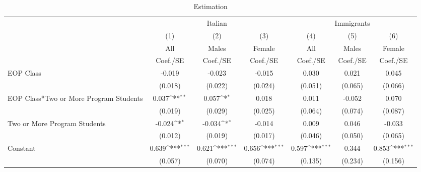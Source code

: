 \begin{table}[htbp]\centering
\def\sym#1{\ifmmode^{#1}\else\(^{#1}\)\fi}
\caption{Estimation \label{peer\_lictec2}}
\begin{tabular}{l*{6}{c}}
\toprule
                    &\multicolumn{3}{c}{Italian}                                      &\multicolumn{3}{c}{Immigrants}                                   \\\cmidrule(lr){2-4}\cmidrule(lr){5-7}
                    &\multicolumn{1}{c}{(1)}&\multicolumn{1}{c}{(2)}&\multicolumn{1}{c}{(3)}&\multicolumn{1}{c}{(4)}&\multicolumn{1}{c}{(5)}&\multicolumn{1}{c}{(6)}\\
                    &\multicolumn{1}{c}{All}&\multicolumn{1}{c}{Males}&\multicolumn{1}{c}{Female}&\multicolumn{1}{c}{All}&\multicolumn{1}{c}{Males}&\multicolumn{1}{c}{Female}\\
                    &    Coef./SE         &    Coef./SE         &    Coef./SE         &    Coef./SE         &    Coef./SE         &    Coef./SE         \\
\midrule
EOP Class           &      -0.019         &      -0.023         &      -0.015         &       0.030         &       0.021         &       0.045         \\
                    &     (0.018)         &     (0.022)         &     (0.024)         &     (0.051)         &     (0.065)         &     (0.066)         \\
EOP Class*Two or More Program Students&       0.037\sym{**} &       0.057\sym{*}  &       0.018         &       0.011         &      -0.052         &       0.070         \\
                    &     (0.019)         &     (0.029)         &     (0.025)         &     (0.064)         &     (0.074)         &     (0.087)         \\
Two or More Program Students&      -0.024\sym{*}  &      -0.034\sym{*}  &      -0.014         &       0.009         &       0.046         &      -0.033         \\
                    &     (0.012)         &     (0.019)         &     (0.017)         &     (0.046)         &     (0.050)         &     (0.065)         \\
Constant            &       0.639\sym{***}&       0.621\sym{***}&       0.656\sym{***}&       0.597\sym{***}&       0.344         &       0.853\sym{***}\\
                    &     (0.057)         &     (0.070)         &     (0.074)         &     (0.135)         &     (0.234)         &     (0.156)         \\

\end{tabular}
\end{table}
